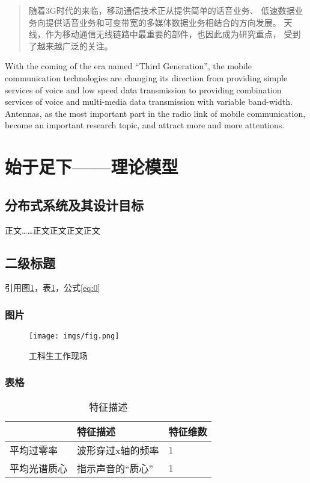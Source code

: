 \documentclass[UTF8,AutoFakeBold=1,AutoFakeSlant,zihao=-4]{cucthesis}
\begin{document}
\coverpage

\begin{abstract}
随着3G时代的来临，移动通信技术正从提供简单的话音业务、
低速数据业务向提供话音业务和可变带宽的多媒体数据业务相结合的方向发展。
天线，作为移动通信无线链路中最重要的部件，也因此成为研究重点，
受到了越来越广泛的关注。
\end{abstract}

\begin{abstractEN}
With the coming of the era named ``Third Generation'',
the mobile communication technologies are changing
its direction from providing simple services of voice
and low speed data transmission to providing combination
services of voice and multi-media data transmission with
variable band-width. Antennas, as the most important part
in the radio link of mobile communication, become an
important research topic, and attract more and more attentions.
\end{abstractEN}

\contentpage

\section{始于足下——理论模型}

\subsection{分布式系统及其设计目标}
正文……\cite{bib01}正文正文\cite{bib02}正文正文\cite{bib01,bib02}

\subsection{二级标题}
引用图\ref{fig}，表\ref{tab}，公式\eqref{eq:0}


\subsubsection{图片}

\begin{figure}[ht]
    \centering
    \texttt{[image: imgs/fig.png]}
    \caption{工科生工作现场}    \label{fig}
\end{figure}

\subsubsection{表格}
\begin{table}[ht]
    \centering\caption{特征描述}
    \begin{tabular}{lll}
    \toprule  \label{tab}
                 & 特征描述    & 特征维数      \\   \midrule
    平均过零率    & 波形穿过x轴的频率   & 1     \\
    平均光谱质心  & 指示声音的“质心”    & 1     \\  \bottomrule
    \end{tabular}
\end{table}
\end{document}

